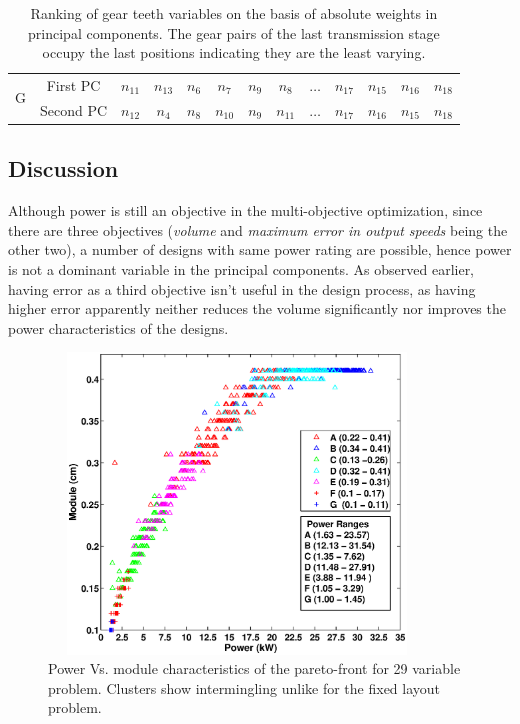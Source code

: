 {\begin{table}[!ht]
\begin{tabular}{|c|c|c|c|c|c|c|c|c|c|c|c|c|}
      \hline
      \cline{1-13}
      \multirow{2}{*}{G}& First PC & \cellcolor[gray]{0.7} $n_{11}$ & \cellcolor[gray]{0.8} $n_{13}$ & \cellcolor[gray]{0.6} $n_{6}$ & \cellcolor[gray]{0.7} $n_{7}$ & \cellcolor[gray]{0.7} $n_{9}$ & \cellcolor[gray]{0.7} $n_{8}$ & $\dots$ &  \cellcolor[gray]{0.9} $n_{17}$ & \cellcolor[gray]{0.9} $n_{15}$ & \cellcolor[gray]{0.9} $n_{16}$ & \cellcolor[gray]{0.9}  $n_{18}$ \\ 
      \cline{2-13}
      & Second PC & \cellcolor[gray]{0.7} $n_{12}$ & \cellcolor[gray]{0.6} $n_{4}$ & \cellcolor[gray]{0.7} $n_{8}$ & \cellcolor[gray]{0.7} $n_{10}$ & \cellcolor[gray]{0.7} $n_{9}$ & \cellcolor[gray]{0.7} $n_{11}$ & $\dots$ &  \cellcolor[gray]{0.9}  $n_{17}$ & \cellcolor[gray]{0.9}  $n_{16}$ & \cellcolor[gray]{0.9} $n_{15}$ & \cellcolor[gray]{0.9} $n_{18}$ \\ 
      \hline
    \end{tabular}
    \caption{Ranking of gear teeth variables on the basis of absolute weights in principal components. The gear pairs of the last transmission stage occupy the last positions indicating they are the least varying.}
    \label{first2gtvnt}
  \end{table}
}


\subsection{Discussion}
Although power is still an objective in the multi-objective optimization,
 since there are three objectives (\emph{volume} and \emph{maximum error
  in output speeds} being the other two), a number of designs with same
power rating are possible, hence power is not a dominant variable in the
principal components. As observed earlier, having error as a third
objective isn't useful in the design process, as having higher error
apparently neither reduces the volume significantly nor improves the power
characteristics of the designs. 


\begin{figure}[ht]\begin{center}
 \includegraphics[width=100mm, height=80mm]{dia/gtvpVsm.eps}
 \caption{Power Vs. module characteristics of the pareto-front for 29
   variable problem. Clusters show intermingling unlike for the fixed layout
   problem.}
 \label{gtvpVsm}
\end{center}\end{figure}

